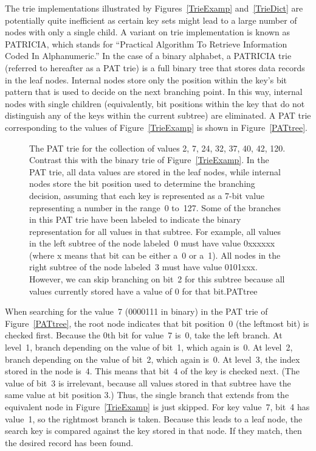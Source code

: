 The trie implementations illustrated by Figures~\ref{TrieExamp}
and~\ref{TrieDict} are potentially quite inefficient as certain key
sets might lead to a large number of nodes with only a single child.
A variant on trie implementation is known as
PATRICIA, which stands for ``Practical Algorithm To Retrieve
Information Coded In Alphanumeric.''
In the case of a binary alphabet, a PATRICIA trie (referred to
hereafter as a PAT trie) is a full binary tree
that stores data records in the leaf nodes.
Internal nodes store only the position within the key's bit pattern
that is used to decide on the next branching point.
In this way, internal nodes with single children (equivalently, bit
positions within the key that do not distinguish any of the keys
within the current subtree) are eliminated.
A PAT trie corresponding to the values of Figure~\ref{TrieExamp}
is shown in Figure~\ref{PATtree}.

\begin{figure}
\vspace{-\smallskipamount}

{The PAT trie for the collection of values
2, 7, 24, 32, 37, 40, 42, 120.
Contrast this with the binary trie of Figure~\ref{TrieExamp}.
In the PAT trie, all data values are stored in the leaf nodes, while
internal nodes store the bit position used to determine the branching
decision, assuming that each key is represented as a 7-bit value
representing a number in the range~0 to~127.
Some of the branches in this PAT trie have been labeled to indicate
the binary representation for all values in that subtree.
For example, all values in the left subtree of the node
labeled~0 must have value 0xxxxxx (where x means that bit can be
either a~0 or a~1).
All nodes in the right subtree of the node labeled~3 must have value
0101xxx.
However, we can skip branching on bit~2 for this subtree because all
values currently stored have a value of 0 for that bit.}{PATtree}
\bigskip
\end{figure}

\begin{example}
When searching for the value~7 (0000111 in binary) in
the PAT trie of Figure~\ref{PATtree},
the root node indicates that bit position~0 (the leftmost bit) is
checked first.
Because the 0th bit for value~7 is~0, take the left branch.
At level~1, branch depending on the value of bit~1, which again
is~0.
At level~2, branch depending on the value of bit~2, which again
is~0.
At level~3, the index stored in the node is~4.
This means that bit~4 of the key is checked next.
(The value of bit~3 is irrelevant, because all values stored in that
subtree have the same value at bit position 3.)
Thus, the single branch that extends from the equivalent node in
Figure~\ref{TrieExamp} is just skipped.
For key value~7, bit~4 has value~1, so the rightmost branch is taken.
Because this leads to a leaf node, the search key is compared against
the key stored in that node.
If they match, then the desired record has been found.
\end{example}

